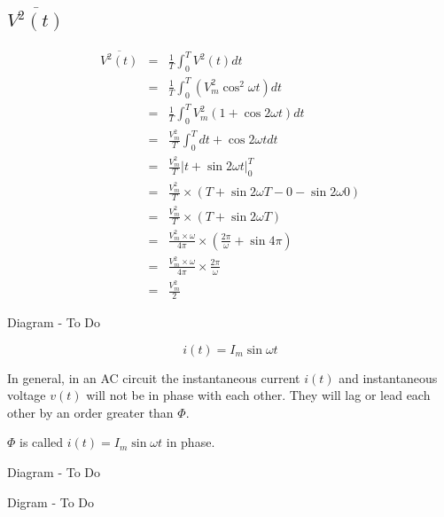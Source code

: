 \documentclass[a4paper,12pt]{article}
\begin{document}
\subsection{$\overline{V^{2}(t)}$}

\begin{eqnarray*}
\overline{V^{2}(t)} & = & \frac{1}{T} \int^{T}_{0} V^{2}(t)  dt \\
						  & = & \frac{1}{T} \int^{T}_{0} (V_{m}^{2} \cos^{2}{\omega t}) dt \\
						  & = & \frac{1}{T} \int^{T}_{0} V_{m}^{2} (1 + \cos{2 \omega t}) dt \\
						  & = & \frac{V_{m}^{2}}{T} \int^{T}_{0} dt + \cos{2 \omega t} dt \\
						  & = & \frac{V_{m}^{2}}{T} \left| t + \sin{2 \omega t} \right|^{T}_{0} \\
						  & = & \frac{V_{m}^{2}}{T} \times \left(T + \sin{2 \omega T} - 0 - \sin{2 \omega 0} \right) \\
						  & = & \frac{V_{m}^{2}}{T} \times \left(T + \sin{2 \omega T} \right) \\
						  & = & \frac{V_{m}^{2} \times \omega}{4 \pi} \times \left(\frac{2 \pi}{\omega} + \sin{4 \pi} \right) \\
						  & = & \frac{V_{m}^{2} \times \omega}{4 \pi} \times \frac{2 \pi}{\omega} \\
						  & = & \frac{V_{m}^{2}}{2}
\end{eqnarray*}


\begin{table}[hbtp]

Diagram - To Do

\end{table}

\[ i(t) = I_{m} \sin \omega t \]

In general, in an AC circuit the instantaneous current $i(t)$
and instantaneous voltage $v(t)$ will not be in phase with each other.
They will lag or lead each other by an order greater than $\Phi$.

$\Phi$ is called $i(t) = I_{m} \sin \omega t$ in phase.

\begin{table}[hbtp]

Diagram - To Do

\end{table}

\begin{table}[hbtp]

Digram - To Do

\end{table}
\end{document}
